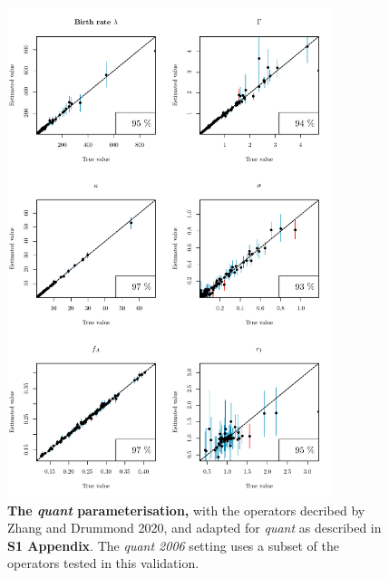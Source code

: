 \documentclass[12pt]{article}
\begin{document}
\begin{figure}[!htb]
\includegraphics[width=0.85\textwidth]{Figures/CalSim_quant.pdf}
\caption{\textbf{The \textit{quant} parameterisation,} with the operators decribed by Zhang and Drummond 2020, and adapted for \textit{quant} as described in \textbf{S1 Appendix}. The \textit{quant 2006} setting uses a subset of the operators tested in this validation.}
\label{fig:rateparams}
\end{figure}
\end{document}
